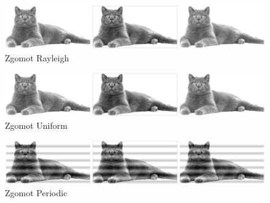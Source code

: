 \documentclass[12pt]{article}
\begin{document}
\vspace{10pt}
\begin{figure}[h!]
    \centering
    \includegraphics[width=1\textwidth]{images/row_6_filters.eps}
    \caption{Zgomot Rayleigh}
    \label{fig:med_rayleigh}
\end{figure}
\vspace{10pt}
\begin{figure}[h!]
    \centering
    \includegraphics[width=1\textwidth]{images/row_7_filters.eps}
    \caption{Zgomot Uniform}
    \label{fig:med_uniform}
\end{figure}
\vspace{10pt} \newpage

\begin{figure}[h!]
    \centering
    \includegraphics[width=1\textwidth]{images/row_8_filters.eps}
    \caption{Zgomot Periodic}
    \label{fig:med_periodic}
\end{figure}
\vspace{15pt}
\end{document}
